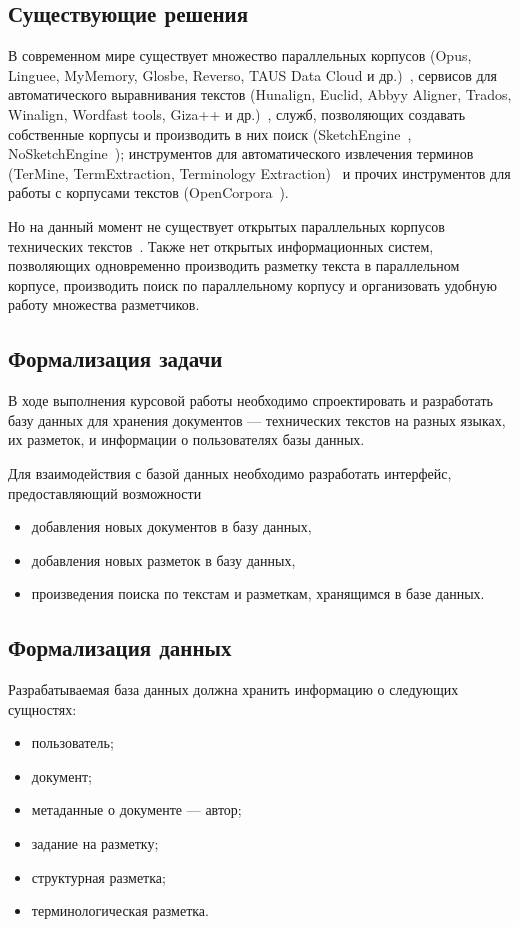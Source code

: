 \subsection{Существующие решения}

В современном мире существует множество параллельных корпусов (Opus, Linguee, MyMemory, Glosbe, Reverso, TAUS Data Cloud и др.)~\cite{butenko2020-1}, сервисов для автоматического выравнивания текстов (Hunalign, Euclid, Abbyy Aligner, Trados, Winalign, Wordfast tools, Giza++ и др.)~\cite[с. 62]{cl2020}, служб, позволяющих создавать собственные корпусы и производить в них поиск (SketchEngine~\cite{ske}, NoSketchEngine~\cite{noske}); инструментов для автоматического извлечения терминов (TerMine, TermExtraction, Terminology Extraction)~\cite{butenko2022} и прочих инструментов для работы с корпусами текстов (OpenCorpora~\cite{opencorpora}).

Но на данный момент не существует открытых параллельных корпусов технических текстов~\cite{butenko2020-2}.
Также нет открытых информационных систем, позволяющих одновременно производить разметку текста в параллельном корпусе, производить поиск по параллельному корпусу и организовать удобную работу множества разметчиков.

\subsection{Формализация задачи}

В ходе выполнения курсовой работы необходимо спроектировать и разработать базу данных для хранения документов --- технических текстов на разных языках, их разметок, и информации о пользователях базы данных.

Для взаимодействия с базой данных необходимо разработать интерфейс, предоставляющий возможности
\begin{itemize}
    \item добавления новых документов в базу данных,
    \item добавления новых разметок в базу данных,
    \item произведения поиска по текстам и разметкам, хранящимся в базе данных.
\end{itemize}

\subsection{Формализация данных}

Разрабатываемая база данных должна хранить информацию о следующих сущностях:
\begin{itemize}
    \item пользователь;
    \item документ;
    \item метаданные о документе --- автор;
    \item задание на разметку;
    \item структурная разметка;
    \item терминологическая разметка.
\end{itemize}

